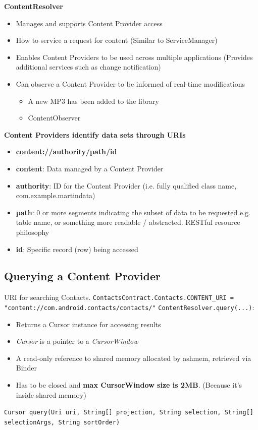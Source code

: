 \documentclass{article}
\begin{document}
\begin{flushleft}
\textbf{ContentResolver}
\begin{itemize}
  \item Manages and supports Content Provider access 
  \item How to service a request for content (Similar to ServiceManager) 
  \item Enables Content Providers to be used across multiple applications (Provides additional services such as change notification)
  \item Can observe a Content Provider to be informed of real-time modifications
  \begin{itemize}
    \item A new MP3 has been added to the library 
    \item ContentObserver
  \end{itemize}
\end{itemize}
\textbf{Content Providers identify data sets through URIs}
\begin{itemize}
  \item \textbf{content://authority/path/id} 
  \item \textbf{content}: Data managed by a Content Provider 
  \item \textbf{authority}: ID for the Content Provider (i.e. fully qualified class name, com.example.martindata) 
  \item \textbf{path}: 0 or more segments indicating the subset of data to be requested e.g. table name, or something more readable / abstracted. RESTful resource philosophy 
  \item \textbf{id}: Specific record (row) being accessed
\end{itemize}
\end{flushleft}

\pagebreak

\subsection{Querying a Content Provider}
  
\begin{flushleft}
URI for searching Contacts. \verb|ContactsContract.Contacts.CONTENT_URI = "content://com.android.contacts/contacts/"|
\verb|ContentResolver.query(...)|:
\begin{itemize}
  \item Returns a Cursor instance for accessing results 
  \item \textit{Cursor} is a pointer to a \textit{CursorWindow} 
  \item A read-only reference to shared memory allocated by ashmem, retrieved via Binder 
  \item Has to be closed and \textbf{max CursorWindow size is 2MB}. (Because it's inside shared memory)
\end{itemize}
\verb|Cursor query(Uri uri, String[] projection, String selection, String[] selectionArgs, String sortOrder)|
\end{flushleft}
\end{document}
